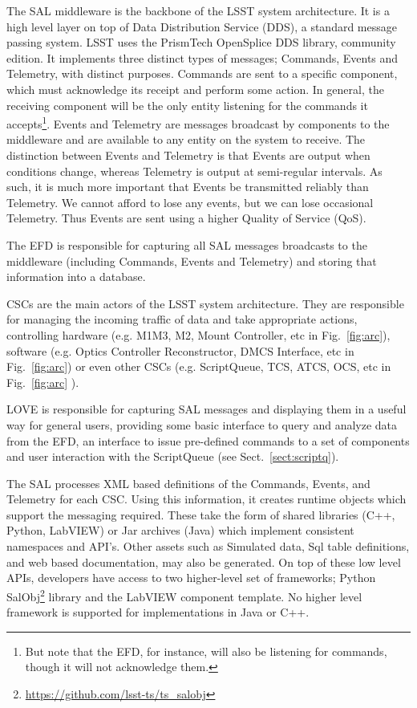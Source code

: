 The SAL middleware is the backbone of the LSST system architecture. It is a high level layer on top of Data 
Distribution Service (DDS), a standard message passing system. LSST uses the PrismTech OpenSplice DDS library, 
community edition. It implements three distinct types of messages; Commands, Events and Telemetry, with distinct 
purposes. Commands are sent to a specific component, which must acknowledge its receipt and perform some action. 
In general, the receiving component will be the only entity listening for the commands it accepts\footnote{But note that the EFD, for instance, will also be listening for 
commands, though it will not acknowledge them.}. Events and Telemetry are messages broadcast by components to the 
middleware and are available to any entity on the system to receive. The distinction between Events and Telemetry is that 
Events are output when conditions change, whereas Telemetry is output at semi-regular intervals. As such, it is much more 
important that Events be transmitted reliably than Telemetry. We cannot afford to lose any events, but we can lose occasional 
Telemetry. Thus Events are sent using a higher Quality of Service (QoS).

The EFD is responsible for capturing all SAL messages broadcasts to the middleware (including Commands, Events and Telemetry) and storing that information into a database.

CSCs are the main actors of the LSST system architecture. They are responsible for managing the incoming traffic of data and take 
appropriate actions, controlling hardware (e.g. M1M3, M2, Mount Controller, etc in Fig.~\ref{fig:arc}), software (e.g. Optics Controller 
Reconstructor, DMCS Interface, etc in Fig.~\ref{fig:arc}) or even other CSCs (e.g. ScriptQueue, TCS, ATCS, OCS, etc in 
Fig.~\ref{fig:arc} ).

LOVE is responsible for capturing SAL messages and displaying them in a useful way for general users, providing some basic interface to 
query and analyze data from the EFD, an interface to issue pre-defined commands to a set of components and user interaction with the 
ScriptQueue (see Sect.~\ref{sect:scriptq}).

The SAL processes XML based definitions of the Commands, Events, and Telemetry for each CSC. Using this information, it creates 
runtime objects which support the messaging required. These take the form of shared libraries (C++, Python, LabVIEW) or Jar archives 
(Java) which implement consistent namespaces and API's. Other assets such as Simulated data, Sql table definitions, and web based 
documentation, may also be generated. On top of these low level APIs, developers have access to two higher-level set of frameworks; 
Python SalObj\footnote{\url{https://github.com/lsst-ts/ts_salobj}} library and the LabVIEW component template. No higher level framework 
is supported for implementations in Java or C++.

